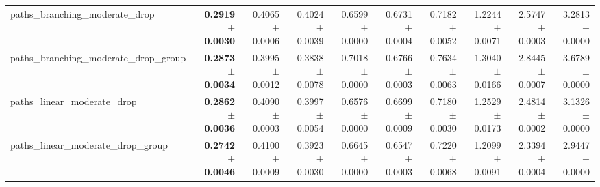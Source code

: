 \begin{tabular}{@{}lrrrrrrrrr@{}}
paths\_branching\_moderate\_drop & \textbf{0.2919 $\pm$ 0.0030} & 0.4065 $\pm$ 0.0006 & 0.4024 $\pm$ 0.0039 & 0.6599 $\pm$ 0.0000 & 0.6731 $\pm$ 0.0004 & 0.7182 $\pm$ 0.0052 & 1.2244 $\pm$ 0.0071 & 2.5747 $\pm$ 0.0003 & 3.2813 $\pm$ 0.0000 \\
paths\_branching\_moderate\_drop\_group & \textbf{0.2873 $\pm$ 0.0034} & 0.3995 $\pm$ 0.0012 & 0.3838 $\pm$ 0.0078 & 0.7018 $\pm$ 0.0000 & 0.6766 $\pm$ 0.0003 & 0.7634 $\pm$ 0.0063 & 1.3040 $\pm$ 0.0166 & 2.8445 $\pm$ 0.0007 & 3.6789 $\pm$ 0.0000 \\
paths\_linear\_moderate\_drop & \textbf{0.2862 $\pm$ 0.0036} & 0.4090 $\pm$ 0.0003 & 0.3997 $\pm$ 0.0054 & 0.6576 $\pm$ 0.0000 & 0.6699 $\pm$ 0.0009 & 0.7180 $\pm$ 0.0030 & 1.2529 $\pm$ 0.0173 & 2.4814 $\pm$ 0.0002 & 3.1326 $\pm$ 0.0000 \\
paths\_linear\_moderate\_drop\_group & \textbf{0.2742 $\pm$ 0.0046} & 0.4100 $\pm$ 0.0009 & 0.3923 $\pm$ 0.0030 & 0.6645 $\pm$ 0.0000 & 0.6547 $\pm$ 0.0003 & 0.7220 $\pm$ 0.0068 & 1.2099 $\pm$ 0.0091 & 2.3394 $\pm$ 0.0004 & 2.9447 $\pm$ 0.0000 \\
\bottomrule
\end{tabular}
